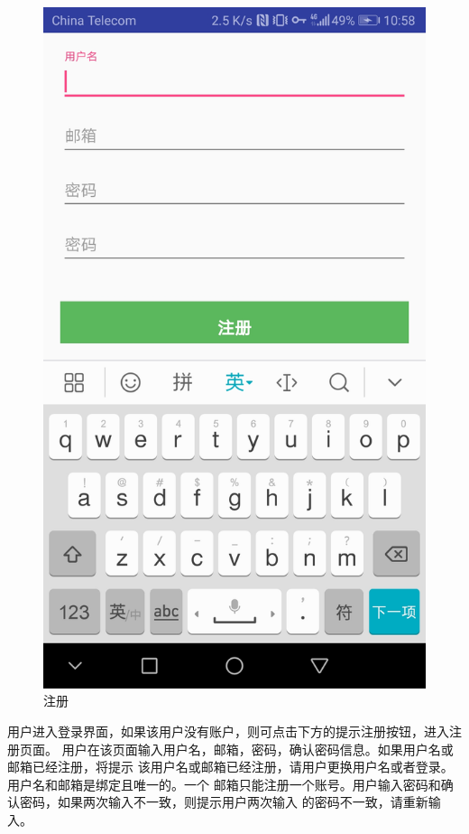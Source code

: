 \begin{figure}[h]
	\centering
	\includegraphics[scale=0.09]{Chapters/UI/register.jpg}
	\caption{注册}
	\label{register}
\end{figure}

用户进入登录界面，如果该用户没有账户，则可点击下方的提示注册按钮，进入注册页面。
用户在该页面输入用户名，邮箱，密码，确认密码信息。如果用户名或邮箱已经注册，将提示
该用户名或邮箱已经注册，请用户更换用户名或者登录。用户名和邮箱是绑定且唯一的。一个
邮箱只能注册一个账号。用户输入密码和确认密码，如果两次输入不一致，则提示用户两次输入
的密码不一致，请重新输入。




